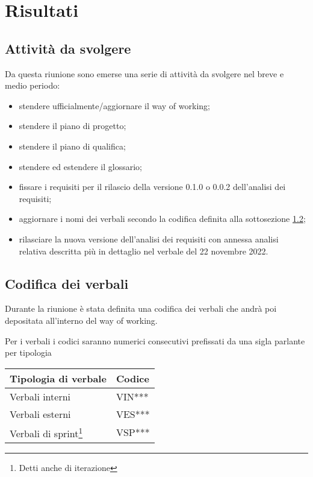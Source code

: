 \section{Risultati}

\subsection{Attività da svolgere}

Da questa riunione sono emerse una serie di attività da svolgere nel breve e medio periodo:

\begin{itemize}
    \item stendere ufficialmente/aggiornare il way of working;
    \item stendere il piano di progetto;
    \item stendere il piano di qualifica;
    \item stendere ed estendere il glossario;
    \item fissare i requisiti per il rilascio della versione 0.1.0 o 0.0.2 dell'analisi dei requisiti;
    \item aggiornare i nomi dei verbali secondo la codifica definita alla sottosezione \ref{codifica-verbali};
    \item rilasciare la nuova versione dell'analisi dei requisiti con annessa analisi relativa descritta più in dettaglio nel verbale del 22 novembre 2022.
\end{itemize}

\subsection{Codifica dei verbali}\label{codifica-verbali}

Durante la riunione è stata definita una codifica dei verbali che andrà poi depositata all'interno del way of working.

Per i verbali i codici saranno numerici consecutivi prefissati da una sigla parlante per tipologia

\begin{center}
    \begin{tabularx}{10cm}{X | l}            
        \textbf{Tipologia di verbale} & \textbf{Codice}\\

        \hline

        Verbali interni & VIN***\\
        Verbali esterni & VES***\\
        Verbali di sprint\footnote{Detti anche di iterazione} & VSP***\\

    \end{tabularx}
\end{center}
